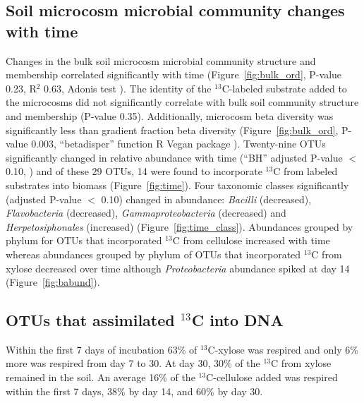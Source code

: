 \subsection{Soil microcosm microbial community changes with time}
Changes in the bulk soil microcosm microbial community structure and membership
correlated significantly with time (Figure~\ref{fig:bulk_ord},
P-value 0.23, R$^{2}$ 0.63, Adonis test \citep{Anderson2001a}). The identity of
the $^{13}$C-labeled substrate added to the microcosms did not significantly
correlate with bulk soil community structure and membership (P-value 0.35).
Additionally, microcosm beta diversity was significantly less than gradient
fraction beta diversity (Figure~\ref{fig:bulk_ord}, P-value 0.003,
``betadisper'' function R Vegan package \citep{Anderson2006,oksanen2007vegan}).
Twenty-nine OTUs significantly changed in relative abundance with time (``BH''
adjusted P-value $<$ 0.10, \citep{YBenjamini1995}) and of these 29 OTUs, 14
were found to incorporate $^{13}$C from labeled substrates into biomass
(Figure~\ref{fig:time}). Four taxonomic classes significantly (adjusted P-value
$<$ 0.10) changed in abundance: \textit{Bacilli} (decreased),
\textit{Flavobacteria} (decreased), \textit{Gammaproteobacteria} (decreased)
and \textit{Herpetosiphonales} (increased) (Figure~\ref{fig:time_class}).
Abundances grouped by phylum for OTUs that incorporated $^{13}$C from cellulose
increased with time whereas abundances grouped by phylum of OTUs that
incorporated $^{13}$C from xylose decreased over time although
\textit{Proteobacteria} abundance spiked at day 14 (Figure~\ref{fig:babund}).

\subsection{OTUs that assimilated $^{13}$C into DNA} \label{responders}
Within the first 7 days of incubation 63\% of $^{13}$C-xylose was
respired and only 6\% more was respired from day 7 to 30. At day 30, 30\% of
the $^{13}$C from xylose remained in the soil. An average 16\% of the
$^{13}$C-cellulose added was respired within the first 7 days, 38\% by day 14,
and 60\% by day 30.   


